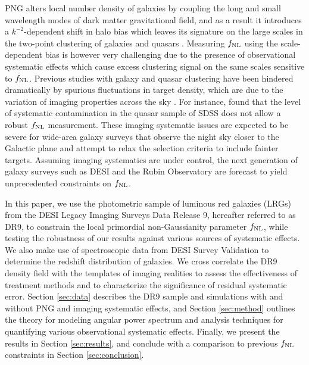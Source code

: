PNG alters local number density of galaxies by coupling the long and small wavelength modes of dark matter gravitational field, and as a result it introduces a $k^{-2}$-dependent shift in halo bias which leaves its signature on the large scales in the two-point clustering of galaxies and quasars \citep[see, e.g.,][]{dalal2008imprints}. Measuring $f_{\rm NL}$ using the scale-dependent bias is however very challenging due to the presence of observational systematic effects which cause excess clustering signal on the same scales sensitive to $f_{\rm NL}$. Previous studies with galaxy and quasar clustering have been hindered dramatically by spurious fluctuations in target density, which are due to the variation of imaging properties across the sky \citep{Ho2015JCAP...05..040H}. For instance, \cite{pullen2013systematic} found that the level of systematic contamination in the quasar sample of SDSS  does not allow a robust $f_{\rm NL}$ measurement. These imaging systematic issues are expected to be severe for wide-area galaxy surveys that observe the night sky closer to the Galactic plane and attempt to relax the selection criteria to  include fainter targets. Assuming imaging systematics are under control, the next generation of galaxy surveys such as DESI and the Rubin Observatory are forecast to yield unprecedented constraints on $f_{\rm NL}$.

In this paper, we use the photometric sample of luminous red galaxies (LRGs) from the DESI Legacy Imaging Surveys Data Release 9, hereafter referred to as DR9, to constrain the local primordial non-Gaussianity parameter $f_{\rm NL}$, while testing the robustness of our results against various sources of systematic effects. We also make use of spectroscopic data from DESI Survey Validation to determine the redshift distribution of galaxies. We cross correlate the DR9 density field with the templates of imaging realities to assess the effectiveness of treatment methods and to characterize the significance of residual systematic error. Section \ref{sec:data} describes the DR9 sample and simulations with and without PNG and imaging systematic effects, and Section \ref{sec:method} outlines the theory for modeling angular power spectrum and analysis techniques for quantifying various observational systematic effects. Finally, we present the results in Section \ref{sec:results}, and conclude with a comparison to previous $f_{\rm NL}$ constraints in Section \ref{sec:conclusion}.